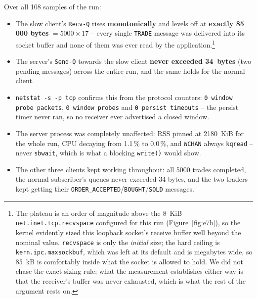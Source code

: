 \documentclass[11pt,a4paper]{article}
\begin{document}
Over all 108 samples of the run:

\begin{itemize}[leftmargin=1.4em,itemsep=2pt]
\item The slow client's \texttt{Recv-Q} rises \textbf{monotonically} and levels off at
      \textbf{exactly 85\,000 bytes} $= 5000 \times 17$ -- every single \texttt{TRADE}
      message was delivered into its socket buffer and none of them was ever read by the
      application.\footnote{The plateau is an order of magnitude above the 8~KiB
      \texttt{net.inet.tcp.recvspace} configured for this run (Figure~\ref{fig:e7b}), so
      the kernel evidently sized this loopback socket's receive buffer well beyond the
      nominal value.  \texttt{recvspace} is only the \emph{initial} size; the hard
      ceiling is \texttt{kern.ipc.maxsockbuf}, which was left at its default and is
      megabytes wide, so 85~kB is comfortably inside what the socket is allowed to hold.
      We did not chase the exact sizing rule; what the measurement
      establishes either way is that the receiver's buffer was never exhausted, which is
      what the rest of the argument rests on.}
\item The server's \texttt{Send-Q} towards the slow client \textbf{never exceeded
      34~bytes} (two pending messages) across the entire run, and the same holds for the
      normal client.
\item \texttt{netstat -s -p tcp} confirms this from the protocol counters:
      \texttt{0 window probe packets}, \texttt{0 window probes} and
      \texttt{0 persist timeouts} -- the persist timer never ran, so no receiver ever
      advertised a closed window.
\item The server process was completely unaffected: RSS pinned at 2180~KiB for the whole
      run, CPU decaying from 1.1\,\% to 0.0\,\%, and \texttt{WCHAN} always
      \texttt{kqread} -- never \texttt{sbwait}, which is what a blocking
      \texttt{write()} would show.
\item The other three clients kept working throughout: all 5000 trades completed, the
      normal subscriber's queues never exceeded 34 bytes, and the two traders kept getting
      their \texttt{ORDER\_ACCEPTED}/\texttt{BOUGHT}/\texttt{SOLD} messages.
\end{itemize}
\end{document}

